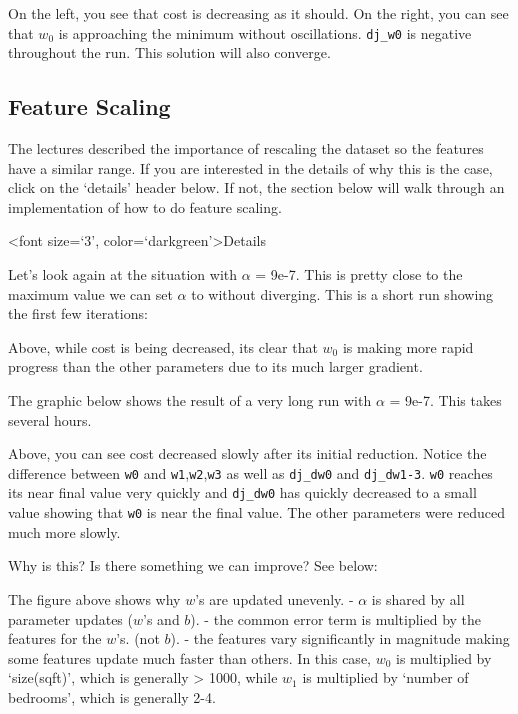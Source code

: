\documentclass[11pt]{article}
\begin{document}
    On the left, you see that cost is decreasing as it should. On the right,
you can see that \(w_0\) is approaching the minimum without
oscillations. \texttt{dj\_w0} is negative throughout the run. This
solution will also converge.

    \hypertarget{feature-scaling}{%
\subsection{Feature Scaling}\label{feature-scaling}}

The lectures described the importance of rescaling the dataset so the
features have a similar range. If you are interested in the details of
why this is the case, click on the `details' header below. If not, the
section below will walk through an implementation of how to do feature
scaling.

    \textless font size=`3', color=`darkgreen'\textgreater{}Details

Let's look again at the situation with \(\alpha\) = 9e-7. This is pretty
close to the maximum value we can set \(\alpha\) to without diverging.
This is a short run showing the first few iterations:

Above, while cost is being decreased, its clear that \(w_0\) is making
more rapid progress than the other parameters due to its much larger
gradient.

The graphic below shows the result of a very long run with \(\alpha\) =
9e-7. This takes several hours.

Above, you can see cost decreased slowly after its initial reduction.
Notice the difference between \texttt{w0} and
\texttt{w1},\texttt{w2},\texttt{w3} as well as \texttt{dj\_dw0} and
\texttt{dj\_dw1-3}. \texttt{w0} reaches its near final value very
quickly and \texttt{dj\_dw0} has quickly decreased to a small value
showing that \texttt{w0} is near the final value. The other parameters
were reduced much more slowly.

Why is this? Is there something we can improve? See below:

The figure above shows why \(w\)'s are updated unevenly. - \(\alpha\) is
shared by all parameter updates (\(w\)'s and \(b\)). - the common error
term is multiplied by the features for the \(w\)'s. (not \(b\)). - the
features vary significantly in magnitude making some features update
much faster than others. In this case, \(w_0\) is multiplied by
`size(sqft)', which is generally \textgreater{} 1000, while \(w_1\) is
multiplied by `number of bedrooms', which is generally 2-4.
\end{document}
